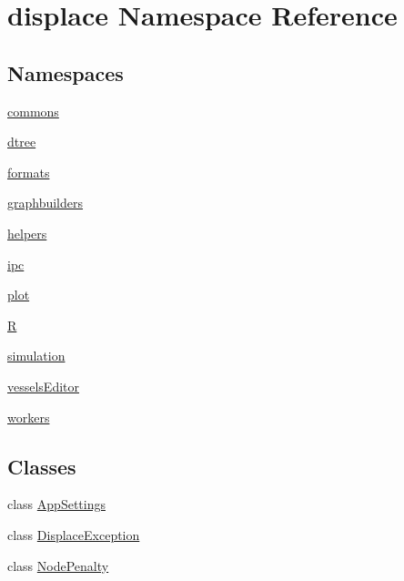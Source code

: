 \hypertarget{namespacedisplace}{}\section{displace Namespace Reference}
\label{namespacedisplace}
\subsection*{Namespaces}
\begin{DoxyCompactItemize}
\item 
 \mbox{\hyperlink{namespacedisplace_1_1commons}{commons}}
\item 
 \mbox{\hyperlink{namespacedisplace_1_1dtree}{dtree}}
\item 
 \mbox{\hyperlink{namespacedisplace_1_1formats}{formats}}
\item 
 \mbox{\hyperlink{namespacedisplace_1_1graphbuilders}{graphbuilders}}
\item 
 \mbox{\hyperlink{namespacedisplace_1_1helpers}{helpers}}
\item 
 \mbox{\hyperlink{namespacedisplace_1_1ipc}{ipc}}
\item 
 \mbox{\hyperlink{namespacedisplace_1_1plot}{plot}}
\item 
 \mbox{\hyperlink{namespacedisplace_1_1_r}{R}}
\item 
 \mbox{\hyperlink{namespacedisplace_1_1simulation}{simulation}}
\item 
 \mbox{\hyperlink{namespacedisplace_1_1vessels_editor}{vessels\+Editor}}
\item 
 \mbox{\hyperlink{namespacedisplace_1_1workers}{workers}}
\end{DoxyCompactItemize}
\subsection*{Classes}
\begin{DoxyCompactItemize}
\item 
class \mbox{\hyperlink{classdisplace_1_1_app_settings}{App\+Settings}}
\item 
class \mbox{\hyperlink{classdisplace_1_1_displace_exception}{Displace\+Exception}}
\item 
class \mbox{\hyperlink{classdisplace_1_1_node_penalty}{Node\+Penalty}}
\end{DoxyCompactItemize}
